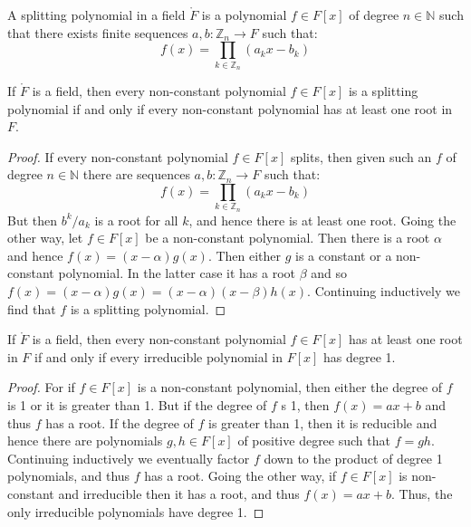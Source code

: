     \begin{definition}
        A splitting polynomial in a field $\ring{F}$ is a polynomial
        $f\in{F}[x]$ of degree $n\in\mathbb{N}$ such that there exists
        finite sequences $a,b:\mathbb{Z}_{n}\rightarrow{F}$ such that:
        \begin{equation}
            f(x)=\prod_{k\in\mathbb{Z}_{n}}(a_{k}x-b_{k})
        \end{equation}
    \end{definition}
    \begin{theorem}
        If $\ring{F}$ is a field, then every non-constant polynomial
        $f\in{F}[x]$ is a splitting polynomial if and only if every
        non-constant polynomial has at least one root in $F$.
    \end{theorem}
    \begin{proof}
        If every non-constant polynomial $f\in{F}[x]$ splits, then given
        such an $f$ of degree $n\in\mathbb{N}$ there are sequences
        $a,b:\mathbb{Z}_{n}\rightarrow{F}$ such that:
        \begin{equation}
            f(x)=\prod_{k\in\mathbb{Z}_{n}}(a_{k}x-b_{k})
        \end{equation}
        But then $b^{k}/a_{k}$ is a root for all $k$, and hence there is at
        least one root. Going the other way, let $f\in{F}[x]$ be a
        non-constant polynomial. Then there is a root $\alpha$ and hence
        $f(x)=(x-\alpha)g(x)$. Then either $g$ is a constant or a
        non-constant polynomial. In the latter case it has a root $\beta$
        and so $f(x)=(x-\alpha)g(x)=(x-\alpha)(x-\beta)h(x)$. Continuing
        inductively we find that $f$ is a splitting polynomial.
    \end{proof}
    \begin{theorem}
        If $\ring{F}$ is a field, then every non-constant polynomial
        $f\in{F}[x]$ has at least one root in $F$ if and only if every
        irreducible polynomial in $F[x]$ has degree 1.
    \end{theorem}
    \begin{proof}
        For if $f\in{F}[x]$ is a non-constant polynomial, then either
        the degree of $f$ is 1 or it is greater than 1. But if the degree
        of $f$ s 1, then $f(x)=ax+b$ and thus $f$ has a root. If the degree
        of $f$ is greater than 1, then it is reducible and hence there
        are polynomials $g,h\in{F}[x]$ of positive degree such that
        $f=gh$. Continuing inductively we eventually factor $f$ down to the
        product of degree 1 polynomials, and thus $f$ has a root. Going the
        other way, if $f\in{F}[x]$ is non-constant and irreducible then it
        has a root, and thus $f(x)=ax+b$. Thus, the only irreducible
        polynomials have degree 1.
    \end{proof}
